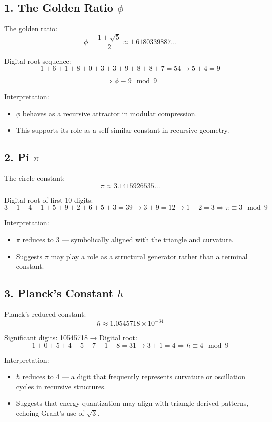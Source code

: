 \documentclass[12pt]{article}
\begin{document}
\subsection*{1. The Golden Ratio \(\phi\)}

The golden ratio:
\[
\phi = \frac{1 + \sqrt{5}}{2} \approx 1.6180339887...
\]

Digital root sequence:
\[
1 + 6 + 1 + 8 + 0 + 3 + 3 + 9 + 8 + 8 + 7 = 54 \rightarrow 5 + 4 = 9
\]

\[
\Rightarrow \phi \equiv 9 \mod 9
\]

Interpretation:
\begin{itemize}[leftmargin=1.5em]
    \item \(\phi\) behaves as a recursive attractor in modular compression.
    \item This supports its role as a self-similar constant in recursive geometry.
\end{itemize}

\subsection*{2. Pi \(\pi\)}

The circle constant:
\[
\pi \approx 3.1415926535...
\]

Digital root of first 10 digits:
\[
3 + 1 + 4 + 1 + 5 + 9 + 2 + 6 + 5 + 3 = 39 \rightarrow 3 + 9 = 12 \rightarrow 1 + 2 = 3
\Rightarrow \pi \equiv 3 \mod 9
\]

Interpretation:
\begin{itemize}[leftmargin=1.5em]
    \item \(\pi\) reduces to 3 — symbolically aligned with the triangle and curvature.
    \item Suggests \(\pi\) may play a role as a structural generator rather than a terminal constant.
\end{itemize}

\subsection*{3. Planck’s Constant \(h\)}

Planck’s reduced constant:
\[
\hbar \approx 1.0545718 \times 10^{-34}
\]

Significant digits: 10545718 → Digital root:
\[
1 + 0 + 5 + 4 + 5 + 7 + 1 + 8 = 31 \rightarrow 3 + 1 = 4
\Rightarrow \hbar \equiv 4 \mod 9
\]

Interpretation:
\begin{itemize}[leftmargin=1.5em]
    \item \( \hbar \) reduces to 4 — a digit that frequently represents curvature or oscillation cycles in recursive structures.
    \item Suggests that energy quantization may align with triangle-derived patterns, echoing Grant’s use of \( \sqrt{3} \).
\end{itemize}
\end{document}
